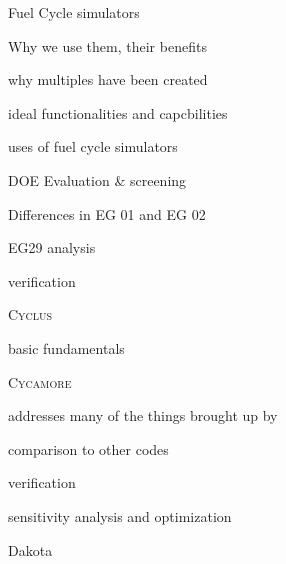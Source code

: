 \documentclass{report}
\newcommand{\Cyclus}{\textsc{Cyclus}\xspace}%
\newcommand{\Cycamore}{\textsc{Cycamore}\xspace}%
\begin{document}
\begin{outline}
\begin{outline}
    \item Fuel Cycle simulators
    \begin{outline}
        \item Why we use them, their benefits
        \item why multiples have been created
        \item ideal functionalities and capcbilities \cite{huff_next_2010,brown_identification_2016}
        \item uses of fuel cycle simulators
        \begin{outline}
            \item \gls{DOE} Evaluation \& screening \cite{wigeland_nuclear_2014}
                \begin{outline}
                      \item Differences in EG 01 and EG 02 
                \end{outline}
            \item EG29 analysis \cite{sunny_transition_2015}
            \item verification \cite{feng_standardized_2016}
        \end{outline}
        \item \Cyclus \cite{huff_fundamental_2016}
        \begin{outline}
              \item basic fundamentals 
              \item \Cycamore \cite{scopatz_cyclus_2015}
              \item addresses many of the things brought up by \cite{huff_next_2010}
              \item comparison to other codes \cite{djokic_application_2015}
              \item verification \cite{bae_standardized_2019}
        \end{outline}
    \end{outline} 
    \item sensitivity analysis and optimization
    \begin{outline}
        \item Dakota \cite{adams_dakota_2019}
    \end{outline}
   

\end{outline}
\end{outline}
\end{document}
